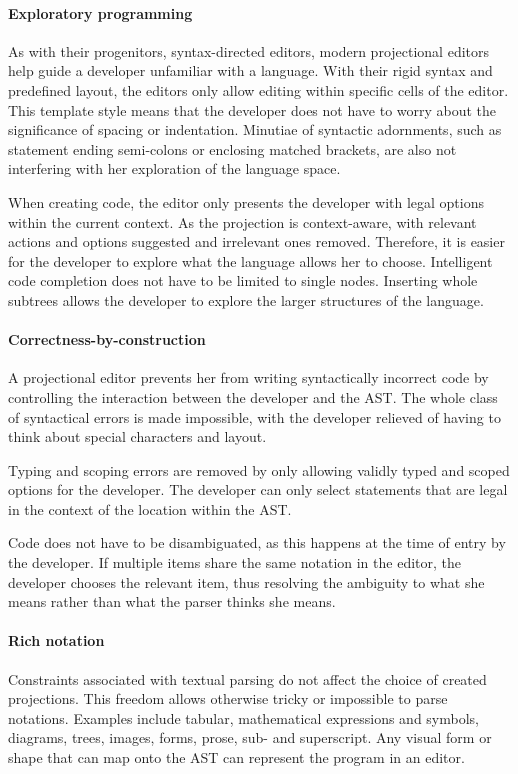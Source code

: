 \paragraph{Exploratory programming} As with their progenitors, syntax-directed editors, modern projectional editors help guide a developer unfamiliar with a language.
With their rigid syntax and predefined layout, the editors only allow editing within specific cells of the editor.
This template style means that the developer does not have to worry about the significance of spacing or indentation.
Minutiae of syntactic adornments, such as statement ending semi-colons or enclosing matched brackets, are also not interfering with her exploration of the language space.

When creating code, the editor only presents the developer with legal options within the current context.
As the projection is context-aware, with relevant actions and options suggested and irrelevant ones removed.
Therefore, it is easier for the developer to explore what the language allows her to choose.
Intelligent code completion does not have to be limited to single nodes.
Inserting whole subtrees allows the developer to explore the larger structures of the language.

\paragraph{Correctness-by-construction} A projectional editor prevents her from writing syntactically incorrect code by controlling the interaction between the developer and the AST.
The whole class of syntactical errors is made impossible, with the developer relieved of having to think about special characters and layout.

Typing and scoping errors are removed by only allowing validly typed and scoped options for the developer.
The developer can only select statements that are legal in the context of the location within the AST.

Code does not have to be disambiguated, as this happens at the time of entry by the developer.
If multiple items share the same notation in the editor, the developer chooses the relevant item, thus resolving the ambiguity to what she means rather than what the parser thinks she means.

\paragraph{Rich notation} Constraints associated with textual parsing do not affect the choice of created projections. 
This freedom allows otherwise tricky or impossible to parse notations.
Examples include tabular, mathematical expressions and symbols, diagrams, trees, images, forms, prose, sub- and superscript.
Any visual form or shape that can map onto the AST can represent the program in an editor.

